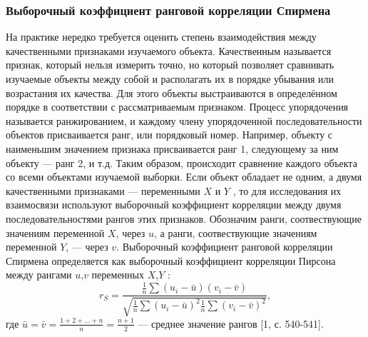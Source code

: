 \documentclass[a4paper,14pt]{article}
\begin{document}
	\subsubsection{Выборочный коэффициент ранговой корреляции Спирмена}
	\noindent На практике нередко требуется оценить степень взаимодействия между качественными признаками изучаемого объекта. Качественным называется признак, который нельзя измерить точно, но который позволяет сравнивать изучаемые объекты между собой и располагать их в порядке убывания или возрастания их качества. Для этого объекты выстраиваются в определённом порядке в соответствии с рассматриваемым признаком. Процесс упорядочения называется ранжированием, и каждому члену упорядоченной последовательности объектов присваивается ранг, или порядковый номер. Например, объекту с наименьшим значением признака присваивается ранг 1, следующему за ним объекту — ранг 2, и т.д. Таким образом, происходит сравнение каждого объекта со всеми объектами изучаемой выборки.
	\newline
	Если объект обладает не одним, а двумя качественными признаками — переменными $X$ и $Y$ , то для исследования их взаимосвязи используют выборочный коэффициент корреляции между двумя последовательностями рангов этих признаков.
	\newline
	Обозначим ранги, соотвествующие значениям переменной $X$, через $u$, а ранги, соотвествующие значениям переменной $Y$, — через $v$.
	\newline
	Выборочный коэффициент ранговой корреляции Спирмена определяется как выборочный коэффициент корреляции Пирсона между рангами $u$,$v$ переменных $X$,$Y$ :
	\begin{equation}
		r_{S} = \frac{
			\frac{1}{n}\sum{(u_{i} - \bar{u})(v_{i}-\bar{v})}
		}{
			\sqrt{\frac{1}{n}\sum{(u_{i} - \bar{u})^{2}}\frac{1}{n}\sum{(v_{i} - \bar{v})^{2}}}
		},
		\label{rS}
	\end{equation}
	где $\bar{u} = \bar{v} = \frac{1 + 2 + ... + n}{n} = \frac{n + 1}{2}$ — среднее значение рангов [1, с. 540-541].
	
\end{document}
